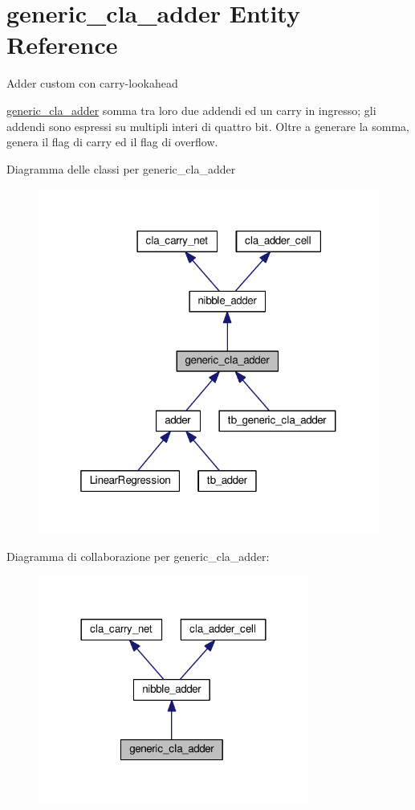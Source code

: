 \hypertarget{classgeneric__cla__adder}{}\section{generic\+\_\+cla\+\_\+adder Entity Reference}
\label{classgeneric__cla__adder}


Adder custom con carry-\/lookahead

\hyperlink{classgeneric__cla__adder}{generic\+\_\+cla\+\_\+adder} somma tra loro due addendi ed un carry in ingresso; gli addendi sono espressi su multipli interi di quattro bit. Oltre a generare la somma, genera il flag di carry ed il flag di overflow.  




Diagramma delle classi per generic\+\_\+cla\+\_\+adder
\nopagebreak
\begin{figure}[H]
\begin{center}
\leavevmode
\includegraphics[width=319pt]{classgeneric__cla__adder__inherit__graph}
\end{center}
\end{figure}


Diagramma di collaborazione per generic\+\_\+cla\+\_\+adder\+:
\nopagebreak
\begin{figure}[H]
\begin{center}
\leavevmode
\includegraphics[width=252pt]{classgeneric__cla__adder__coll__graph}
\end{center}
\end{figure}
